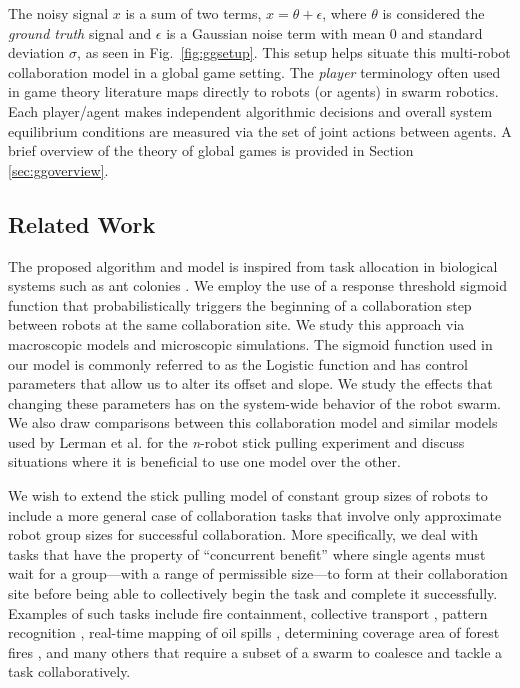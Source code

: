 \documentclass[conference]{IEEEtran}
\begin{document}
The noisy signal $x$ is a sum of two terms, $x = \theta + \epsilon$, where $\theta$ is considered the \emph{ground truth} signal and $\epsilon$ is a Gaussian noise term with mean $0$ and standard deviation $\sigma$, as seen in Fig.~\ref{fig:ggsetup}. This setup helps situate this multi-robot collaboration model in a global game setting. The \emph{player} terminology often used in game theory literature maps directly to robots (or agents) in swarm robotics. Each player/agent makes independent algorithmic decisions and overall system equilibrium conditions are measured via the set of joint actions between agents. A brief overview of the theory of global games is provided in Section \ref{sec:ggoverview}.

\subsection{Related Work}\label{subsec:rw}
The proposed algorithm and model is inspired from task allocation in biological systems such as ant colonies \cite{Bonabeau1999,Krieger2000}. We employ the use of a response threshold sigmoid function that probabilistically triggers the beginning of a collaboration step between robots at the same collaboration site. We study this approach via macroscopic models and microscopic simulations. The sigmoid function used in our model is commonly referred to as the Logistic function and has control parameters that allow us to alter its offset and slope. We study the effects that changing these parameters has on the system-wide behavior of the robot swarm. We also draw comparisons between this collaboration model and similar models used by Lerman et al. for the \emph{n}-robot stick pulling experiment \cite{Lerman2001} and discuss situations where it is beneficial to use one model over the other.

We wish to extend the stick pulling model of constant group sizes of robots to include a more general case of collaboration tasks that involve only approximate robot group sizes for successful collaboration. More specifically, we deal with tasks that have the property of ``concurrent benefit'' where single agents must wait for a group---with a range of permissible size---to form at their collaboration site before being able to collectively begin the task and complete it successfully. Examples of such tasks include fire containment, collective transport \cite{sugawara2012}, pattern recognition \cite{beni1993swarm}, real-time mapping of oil spills \cite{beni2005swarm}, determining coverage area of forest fires \cite{krishnanand2006glowworm}, and many others that require a subset of a swarm to coalesce and tackle a task collaboratively. 
\end{document}
